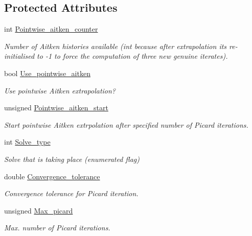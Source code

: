 \subsection*{Protected Attributes}
\begin{DoxyCompactItemize}
\item 
int \hyperlink{classoomph_1_1SegregatableFSIProblem_ad92eead7c5dc21884292a5a501c71388}{Pointwise\+\_\+aitken\+\_\+counter}
\begin{DoxyCompactList}\small\item\em Number of Aitken histories available (int because after extrapolation it\textquotesingle{}s re-\/initialised to -\/1 to force the computation of three new genuine iterates). \end{DoxyCompactList}\item 
bool \hyperlink{classoomph_1_1SegregatableFSIProblem_a16f0551d5e9dbe5b211bb3b05e80f276}{Use\+\_\+pointwise\+\_\+aitken}
\begin{DoxyCompactList}\small\item\em Use pointwise Aitken extrapolation? \end{DoxyCompactList}\item 
unsigned \hyperlink{classoomph_1_1SegregatableFSIProblem_a47bcf35aed40bbb7e1c3778b8dfad501}{Pointwise\+\_\+aitken\+\_\+start}
\begin{DoxyCompactList}\small\item\em Start pointwise Aitken extrpolation after specified number of Picard iterations. \end{DoxyCompactList}\item 
int \hyperlink{classoomph_1_1SegregatableFSIProblem_af238c6f11f6d4aacd2ff6e0dea917d40}{Solve\+\_\+type}
\begin{DoxyCompactList}\small\item\em Solve that is taking place (enumerated flag) \end{DoxyCompactList}\item 
double \hyperlink{classoomph_1_1SegregatableFSIProblem_ad9f2f249e0886878f096926b2cfca74b}{Convergence\+\_\+tolerance}
\begin{DoxyCompactList}\small\item\em Convergence tolerance for Picard iteration. \end{DoxyCompactList}\item 
unsigned \hyperlink{classoomph_1_1SegregatableFSIProblem_aa2a06cb9517d1f183cdbaa20ea077805}{Max\+\_\+picard}
\begin{DoxyCompactList}\small\item\em Max. number of Picard iterations. \end{DoxyCompactList}\item 

\end{DoxyCompactItemize}
